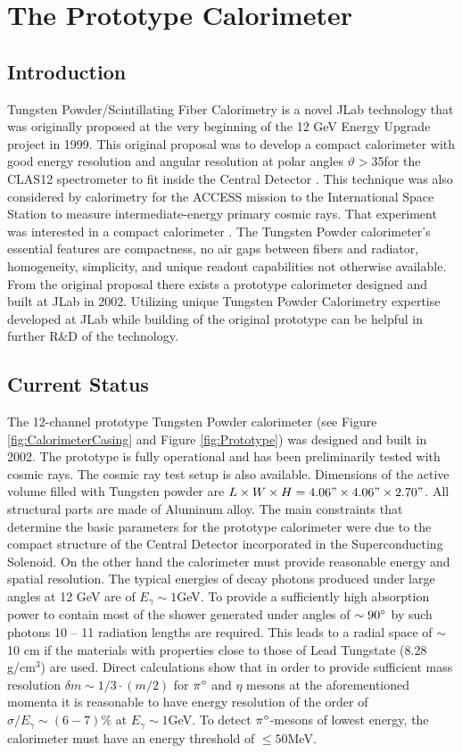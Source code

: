 \section{The Prototype Calorimeter}


\subsection{Introduction}
Tungsten Powder/Scintillating Fiber Calorimetry is a novel JLab technology that was originally proposed at the very beginning of the 12 GeV Energy Upgrade project in 1999. This original proposal was to develop a compact calorimeter with good energy resolution and angular resolution at polar angles $\vartheta$$>$35\degree for the CLAS12 spectrometer to fit inside the Central Detector \cite{Cardman2001}. This technique was also considered by calorimetry for the ACCESS mission to the International Space Station to measure intermediate-energy primary cosmic rays. That experiment was interested in a compact calorimeter 
\cite{Access}.
The Tungsten Powder calorimeter’s essential features are compactness, no air gaps between fibers and radiator, homogeneity, simplicity, and unique readout capabilities not otherwise available. From the original proposal there exists a prototype calorimeter designed and built at JLab in 2002. Utilizing unique Tungsten Powder Calorimetry expertise developed at JLab while building of the original prototype can be helpful in further R\&D of the technology.

\subsection{Current Status}

The 12-channel prototype Tungsten Powder calorimeter (see Figure \ref{fig:CalorimeterCasing} and Figure \ref{fig:Prototype}) was designed and built in 2002. The prototype is fully operational and has been preliminarily tested with cosmic rays. The cosmic ray test setup is also available. Dimensions of the active volume filled with Tungsten powder are $L \times W \times H = 4.06" \times 4.06" \times 2.70"$. All structural parts are made of Aluminum alloy. The main constraints that determine the basic parameters for the prototype calorimeter were due to the compact structure of the Central Detector incorporated in the Superconducting Solenoid. On the other hand the calorimeter must provide reasonable energy and spatial resolution. The typical energies of decay photons produced under large angles at 12 GeV are of $E_{\gamma}\sim1$GeV. To provide a sufficiently high absorption power to contain most of the shower generated under angles of $\sim90\degree$ by such photons 10 -- 11 radiation lengths are required. This leads to a radial space of $\sim$10 cm if the materials with properties close to those of Lead Tungstate (8.28 g/cm$^3$) are used. Direct calculations show that in order to provide sufficient mass resolution $\delta m\sim1/3\cdot(m/2)$ for $\pi\degree$ and $\eta$ mesons at the aforementioned momenta it is reasonable to have energy resolution of the order of $\sigma/E_{\gamma}\sim(6-7)\%$ at $E_{\gamma}\sim1$GeV. To detect $\pi\degree$-mesons of lowest energy, the calorimeter must have an energy threshold of $\leq50$MeV.

